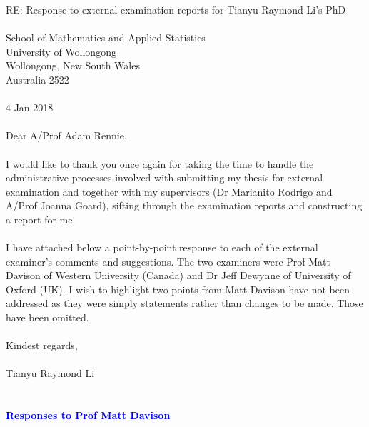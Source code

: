 \documentclass{article}
\begin{document}
RE: Response to external examination reports for Tianyu Raymond Li's PhD
\\
\\
School of Mathematics and Applied Statistics \\
University of Wollongong \\
Wollongong, New South Wales \\
Australia 2522
\\
\\
4 Jan 2018
\\
\\
Dear A/Prof Adam Rennie,
\\
\\
I would like to thank you once again for taking the time to handle the administrative processes involved with submitting my thesis for external examination and together with my supervisors (Dr Marianito Rodrigo and A/Prof Joanna Goard), sifting through the examination reports and constructing a report for me. 
\\
\\
I have attached below a point-by-point response to each of the external examiner's comments and suggestions. The two examiners were Prof Matt Davison of Western University (Canada) and Dr Jeff Dewynne of University of Oxford (UK). I wish to highlight two points from Matt Davison have not been addressed as they were simply statements rather than changes to be made. Those have been omitted.
\\
\\
Kindest regards,
\\
\\
Tianyu Raymond Li
\\
\\
\\
\textcolor{blue}{\textbf{Responses to Prof Matt Davison\\ \\}}
\end{document}
